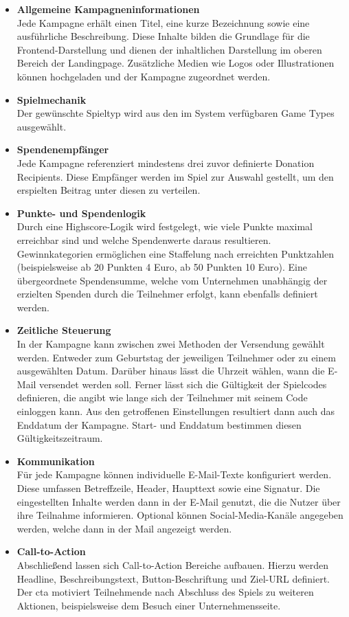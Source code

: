 \begin{itemize}
\item \textbf{Allgemeine Kampagneninformationen} \\
Jede Kampagne erhält einen Titel, eine kurze Bezeichnung sowie eine ausführliche Beschreibung.
Diese Inhalte bilden die Grundlage für die Frontend-Darstellung und dienen der inhaltlichen Darstellung im oberen Bereich der Landingpage.
Zusätzliche Medien wie Logos oder Illustrationen können hochgeladen und der Kampagne zugeordnet werden.

\item \textbf{Spielmechanik} \\
Der gewünschte Spieltyp wird aus den im System verfügbaren Game Types ausgewählt.

\item \textbf{Spendenempfänger} \\
Jede Kampagne referenziert mindestens drei zuvor definierte Donation Recipients.
Diese Empfänger werden im Spiel zur Auswahl gestellt, um den erspielten Beitrag unter diesen zu verteilen.

\item \textbf{Punkte- und Spendenlogik} \\
Durch eine Highscore-Logik wird festgelegt, wie viele Punkte maximal erreichbar sind und welche Spendenwerte daraus resultieren.
Gewinnkategorien ermöglichen eine Staffelung nach erreichten Punktzahlen (beispielsweise ab 20 Punkten 4 Euro, ab 50 Punkten 10 Euro).
Eine übergeordnete Spendensumme, welche vom Unternehmen unabhängig der erzielten Spenden durch die Teilnehmer erfolgt, kann ebenfalls definiert werden.

\item \textbf{Zeitliche Steuerung} \\
In der Kampagne kann zwischen zwei Methoden der Versendung gewählt werden.
Entweder zum Geburtstag der jeweiligen Teilnehmer oder zu einem ausgewählten Datum.
Darüber hinaus lässt die Uhrzeit wählen, wann die E-Mail versendet werden soll.
Ferner lässt sich die Gültigkeit der Spielcodes definieren, die angibt wie lange sich der Teilnehmer mit seinem Code einloggen kann.
Aus den getroffenen Einstellungen resultiert dann auch das Enddatum der Kampagne.
Start- und Enddatum bestimmen diesen Gültigkeitszeitraum.

\item \textbf{Kommunikation} \\
Für jede Kampagne können individuelle E-Mail-Texte konfiguriert werden.
Diese umfassen Betreffzeile, Header, Haupttext sowie eine Signatur.
Die eingestellten Inhalte werden dann in der E-Mail genutzt, die die Nutzer über ihre Teilnahme informieren.
Optional können Social-Media-Kanäle angegeben werden, welche dann in der Mail angezeigt werden.

\item \textbf{Call-to-Action} \\
Abschließend lassen sich Call-to-Action Bereiche aufbauen. Hierzu werden Headline, Beschreibungstext, Button-Beschriftung und Ziel-URL definiert.
Der \gls{cta} motiviert Teilnehmende nach Abschluss des Spiels zu weiteren Aktionen, beispielsweise dem Besuch einer Unternehmensseite.
\end{itemize}

